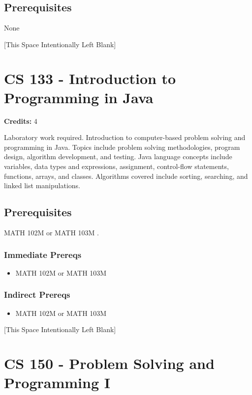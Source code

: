 \documentclass[]{article}
\providecommand{\tightlist}{%
  \setlength{\itemsep}{0pt}\setlength{\parskip}{0pt}}
\newcommand{\pagebreakhere}{
\vspace*{\fill}
\begin{center}
[This Space Intentionally Left Blank]
\end{center}
\vspace*{\fill}
\newpage
}
\begin{document}
\subsection{Prerequisites}\label{prerequisites-3}

None

\pagebreakhere
\section{CS 133 - Introduction to Programming in
Java}\label{cs-133---introduction-to-programming-in-java}

\textbf{Credits:} 4

Laboratory work required. Introduction to computer-based problem solving
and programming in Java. Topics include problem solving methodologies,
program design, algorithm development, and testing. Java language
concepts include variables, data types and expressions, assignment,
control-flow statements, functions, arrays, and classes. Algorithms
covered include sorting, searching, and linked list manipulations.

\subsection{Prerequisites}\label{prerequisites-4}

MATH 102M or MATH 103M .

\subsubsection{Immediate Prereqs}\label{immediate-prereqs-1}

\begin{itemize}
\tightlist
\item
  MATH 102M or MATH 103M
\end{itemize}

\subsubsection{Indirect Prereqs}\label{indirect-prereqs-1}

\begin{itemize}
\tightlist
\item
  MATH 102M or MATH 103M
\end{itemize}

\pagebreakhere
\section{CS 150 - Problem Solving and Programming
I}\label{cs-150---problem-solving-and-programming-i}
\end{document}
